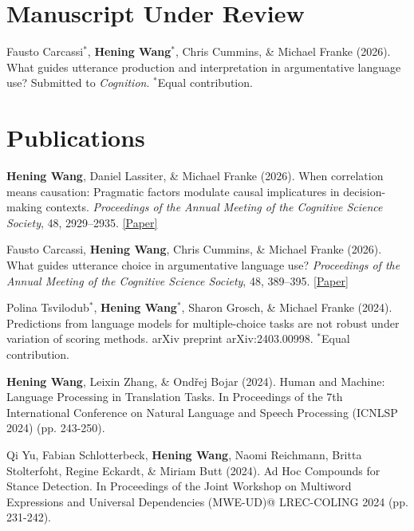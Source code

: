 \documentclass[letterpaper,11pt]{article}
\begin{document}
\section{Manuscript Under Review}
\begin{description}
\item {Fausto Carcassi$^*$, \textbf{Hening Wang}$^*$, Chris Cummins, \& Michael Franke (2026). What guides utterance production and interpretation in argumentative language use? Submitted to \textit{Cognition}. $^*$Equal contribution.}
\end{description}

\section{Publications}
\begin{description}
\item {\textbf{Hening Wang}, Daniel Lassiter, \& Michael Franke (2026). When correlation means causation: Pragmatic factors modulate causal implicatures in decision-making contexts. \textit{Proceedings of the Annual Meeting of the Cognitive Science Society}, 48, 2929--2935. \href{https://escholarship.org/uc/item/8q26s1bh}{[Paper]}}

\item {Fausto Carcassi, \textbf{Hening Wang}, Chris Cummins, \& Michael Franke (2026). What guides utterance choice in argumentative language use? \textit{Proceedings of the Annual Meeting of the Cognitive Science Society}, 48, 389--395. \href{https://escholarship.org/uc/item/2bq1d71z}{[Paper]}}

\item{Polina Tsvilodub$^*$, \textbf{Hening Wang}$^*$, Sharon Grosch, \& Michael Franke (2024). Predictions from language models for multiple-choice tasks are not robust under variation of scoring methods. arXiv preprint arXiv:2403.00998. $^*$Equal contribution.}

\item {\textbf{Hening Wang}, Leixin Zhang, \& Ondřej Bojar (2024). Human and Machine: Language Processing in Translation Tasks. In Proceedings of the 7th International Conference on Natural Language and Speech Processing (ICNLSP 2024) (pp. 243-250).}

\item{Qi Yu, Fabian Schlotterbeck, \textbf{Hening Wang}, Naomi Reichmann, Britta Stolterfoht, Regine Eckardt, \& Miriam Butt (2024). Ad Hoc Compounds for Stance Detection. In Proceedings of the Joint Workshop on Multiword Expressions and Universal Dependencies (MWE-UD)@ LREC-COLING 2024 (pp. 231-242).}


\end{description}
\end{document}
